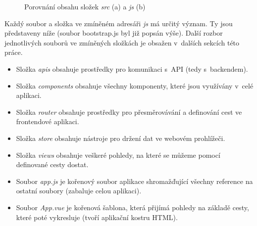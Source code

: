 	\begin{figure}[h]
		\centering
		\qquad
		\caption{Porovnání obsahu složek \textit{src} (a) a \textit{js} (b)}
		\label{fig:zdroj_kod_vue_rozdily}
	\end{figure}

	Každý soubor a složka ve zmíněném adresáři \textit{js} má určitý význam. Ty jsou představeny níže (soubor bootstrap.js byl již popsán výše). Další rozbor jednotlivých souborů ve zmíněných složkách je obsažen v~dalších sekcích této práce.
	\begin{itemize}
		\item Složka \textit{apis} obsahuje prostředky pro komunikaci s~API (tedy s~backendem).
		\item Složka \textit{components} obsahuje všechny komponenty, které jsou využívány v~celé aplikaci.
		\item Složka \textit{router} obsahuje prostředky pro přesměrovávání a definování cest ve frontendové aplikaci.
		\item Složka \textit{store} obsahuje nástroje pro držení dat ve webovém prohlížeči.
		\item Složka \textit{views} obsahuje veškeré pohledy, na které se můžeme pomocí definované cesty dostat.
		\item Soubor \textit{app.js} je kořenový soubor aplikace shromažďující všechny reference na ostatní soubory (zabaluje celou aplikaci).
		\item Soubor \textit{App.vue} je kořenová šablona, která přijímá pohledy na základě cesty, které poté vykresluje (tvoří aplikační kostru HTML).
	\end{itemize}

